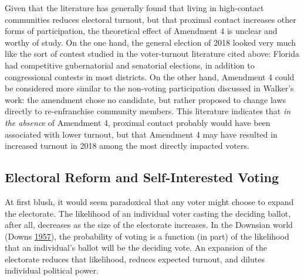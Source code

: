 \documentclass[
  12pt,
]{article}
\begin{document}
Given that the literature has generally found that living in high-contact communities reduces electoral turnout, but that proximal contact increases other forms of participation, the theoretical effect of Amendment 4 is unclear and worthy of study. On the one hand, the general election of 2018 looked very much like the sort of contest studied in the voter-turnout literature cited above: Florida had competitive gubernatorial and senatorial elections, in addition to congressional contests in most districts. On the other hand, Amendment 4 could be considered more similar to the non-voting participation discussed in Walker's work: the amendment chose no candidate, but rather proposed to change laws directly to re-enfranchise community members. This literature indicates that \emph{in the absence} of Amendment 4, proximal contact probably would have been associated with lower turnout, but that Amendment 4 may have resulted in increased turnout in 2018 among the most directly impacted voters.

\hypertarget{electoral-reform-and-self-interested-voting}{%
\subsection*{Electoral Reform and Self-Interested Voting}\label{electoral-reform-and-self-interested-voting}}

At first blush, it would seem paradoxical that any voter might choose to expand the electorate. The likelihood of an individual voter casting the deciding ballot, after all, decreases as the size of the electorate increases. In the Downsian world (Downs \protect\hyperlink{ref-Downs1957}{1957}), the probability of voting is a function (in part) of the likelihood that an individual's ballot will be the deciding vote. An expansion of the electorate reduces that likelihood, reduces expected turnout, and dilutes individual political power.
\end{document}
